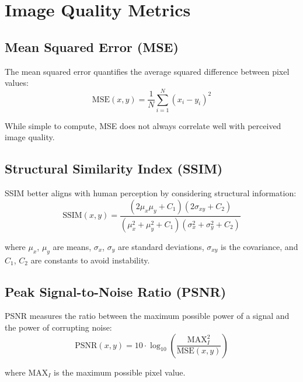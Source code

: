 \documentclass[nomenclature, english, bibtex]{kththesis}
\numberwithin{listing}{chapter}
\begin{document}
\section{Image Quality Metrics}
\subsection{Mean Squared Error (MSE)}
The mean squared error quantifies the average squared difference between pixel values:
\begin{equation}
\text{MSE}(x, y) = \frac{1}{N} \sum_{i=1}^N (x_i - y_i)^2
\end{equation}

While simple to compute, MSE does not always correlate well with perceived image quality.

\subsection{Structural Similarity Index (SSIM)}
SSIM \cite{wang2004image} better aligns with human perception by considering structural information:
\begin{equation}
\text{SSIM}(x, y) = \frac{(2\mu_x\mu_y + C_1)(2\sigma_{xy} + C_2)}{(\mu_x^2 + \mu_y^2 + C_1)(\sigma_x^2 + \sigma_y^2 + C_2)}
\end{equation}

where $\mu_x$, $\mu_y$ are means, $\sigma_x$, $\sigma_y$ are standard deviations, $\sigma_{xy}$ is the covariance, and $C_1$, $C_2$ are constants to avoid instability.

\subsection{Peak Signal-to-Noise Ratio (PSNR)}
PSNR measures the ratio between the maximum possible power of a signal and the power of corrupting noise:
\begin{equation}
\text{PSNR}(x, y) = 10 \cdot \log_{10}\left(\frac{\text{MAX}_I^2}{\text{MSE}(x, y)}\right)
\end{equation}

where $\text{MAX}_I$ is the maximum possible pixel value.
\end{document}

